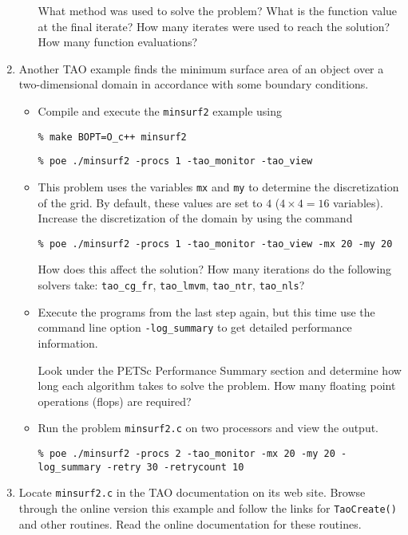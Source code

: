 \documentclass[11pt]{article}
\begin{document}
\begin{enumerate}
\begin{itemize}
  What method was used to solve the problem?
  What is the function value at the final iterate? 
  How many iterates were used to reach the solution?  
  How many function evaluations?

 \newpage

\end{itemize}

\item
Another TAO example finds the minimum surface area of an object over a
two-dimensional domain in accordance with some boundary conditions.

\begin{itemize}

\item
Compile and execute the \texttt{minsurf2} example using
    
\texttt{\% make BOPT=O\_c++ minsurf2}

\texttt{\% poe ./minsurf2 -procs 1 -tao\_monitor -tao\_view}

\item
This problem uses the variables {\tt mx} and {\tt my} to determine
the discretization of the grid.  By default, these values are set to
$4$ ($4 \times 4 = 16$ variables). Increase the discretization of the 
domain by using the command 

\texttt{\% poe ./minsurf2 -procs 1 -tao\_monitor -tao\_view -mx 20 -my 20}

How does this affect the solution?
How many iterations do the following solvers take: \texttt{tao\_cg\_fr},
\texttt{tao\_lmvm}, \texttt{tao\_ntr}, \texttt{tao\_nls}?

\item
Execute the programs from the last step again, but this time use the command line option 
\texttt{-log\_summary} to get detailed performance information.

Look under the PETSc Performance Summary section and determine how long
each algorithm takes to solve the problem. How many floating point operations (flops) are required? 


\item
Run the problem \texttt{minsurf2.c} on two processors and view the output.

\texttt{\% poe ./minsurf2 -procs 2 -tao\_monitor -mx 20 -my 20 -log\_summary -retry 30 -retrycount 10}

\end{itemize}

\item 
  Locate \texttt{minsurf2.c} in the TAO documentation on its web site.  Browse through
  the online version this example and follow the links for
  \texttt{TaoCreate()} and other routines.  Read the online documentation for these routines.


\end{enumerate}
\end{document}
